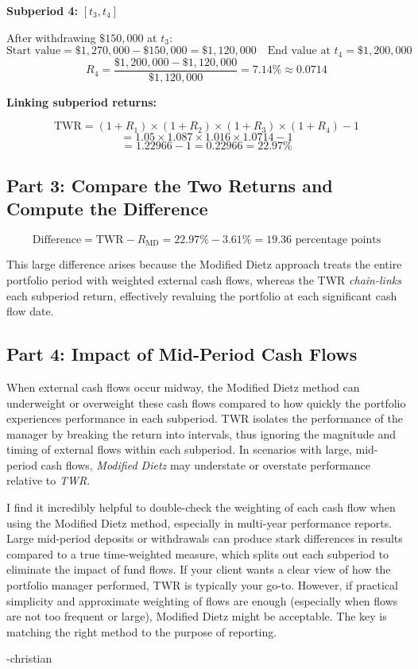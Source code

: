 \noindent \textbf{Subperiod 4: } \( [t_3, t_4] \)

After withdrawing \(\$150{,}000\) at \(t_3\):
\[
\text{Start value} = \$1{,}270{,}000 - \$150{,}000 = \$1{,}120{,}000
\quad 
\text{End value at } t_4 = \$1{,}200{,}000
\]
\[
R_{4} 
= \frac{\$1{,}200{,}000 - \$1{,}120{,}000}{\$1{,}120{,}000} 
= 7.14\%
\approx 0.0714
\]

\noindent \textbf{Linking subperiod returns:}

\[
\text{TWR} 
= (1 + R_{1}) \times (1 + R_{2}) \times (1 + R_{3}) \times (1 + R_{4}) - 1
\]
\[
= 1.05 \times 1.087 \times 1.016 \times 1.0714 - 1
\]
\[
= 1.22966 - 1 
= 0.22966 
= 22.97\%
\]

\subsection*{Part 3: Compare the Two Returns and Compute the Difference}

\[
\text{Difference} 
= \text{TWR} - R_{\text{MD}} 
= 22.97\% - 3.61\%
= 19.36 \text{ percentage points}
\]

\noindent This large difference arises because the Modified Dietz approach treats the entire portfolio period with weighted external cash flows, whereas the TWR \textit{chain-links} each subperiod return, effectively revaluing the portfolio at each significant cash flow date.

\subsection*{Part 4: Impact of Mid-Period Cash Flows}

When external cash flows occur midway, the Modified Dietz method can underweight or overweight these cash flows compared to how quickly the portfolio experiences performance in each subperiod. TWR isolates the performance of the manager by breaking the return into intervals, thus ignoring the magnitude and timing of external flows within each subperiod. In scenarios with large, mid-period cash flows, \textit{Modified Dietz} may understate or overstate performance relative to \textit{TWR}.

\begin{infobox}

I find it incredibly helpful to double-check the weighting of each cash flow when using the Modified Dietz method, especially in multi-year performance reports. Large mid-period deposits or withdrawals can produce stark differences in results compared to a true time-weighted measure, which splits out each subperiod to eliminate the impact of fund flows. If your client wants a clear view of how the portfolio manager performed, TWR is typically your go-to. However, if practical simplicity and approximate weighting of flows are enough (especially when flows are not too frequent or large), Modified Dietz might be acceptable. The key is matching the right method to the purpose of reporting.

-christian

\end{infobox}